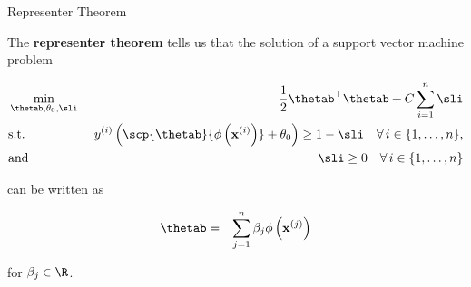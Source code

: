\documentclass[11pt,compress,t,notes=noshow, xcolor=table]{beamer}
\begin{document}
\begin{vbframe}{Representer Theorem}

The \textbf{representer theorem} tells us that the solution of a support vector machine problem 

\vspace*{-0.5cm}

\begin{eqnarray*}
  & \min\limits_{\thetab, \theta_0,\sli} & \frac{1}{2} \thetab^\top \thetab + C   \sum_{i=1}^n \sli \\
  & \text{s.t.} & \,\, \yi  \left( \scp{\thetab}{\phi\left(\xi\right)} + \theta_0 \right) \geq 1 - \sli \quad \forall\, i \in \nset,\\
  & \text{and} & \,\, \sli \geq 0 \quad \forall\, i \in \nset\\
\end{eqnarray*}

\vspace*{-0.5cm}

can be written as 

\begin{eqnarray*}
  \thetab &=& \sum_{j = 1}^n \beta_j \phi\left(\xv^{(j)}\right)
  \end{eqnarray*}

for $\beta_j \in \R$. 

\end{vbframe}
\end{document}
